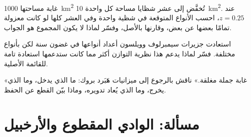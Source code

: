 \begin{exercise}[$\star\star\star$]\label{exo:b1:ecosystem-dynamics:10}
غابة مساحتها \qty{1000}{km^2} تُخفَّض إلى عشر شظايا مساحة كل واحدة
\qty{10}{km^2}. عند $z = 0.25$، احسب الأنواع المتوقعة في شظية
واحدة وفي العشر كلها لو كانت معزولة تمامًا بعضها عن بعض،
وقارنها بالأصل، وفسّر لماذا لا يكون المجموع هو الجواب.
\end{exercise}

\begin{exercise}[$\star\star\star$]\label{exo:b1:ecosystem-dynamics:11}
استعادت جزيرات سيمبرلوف وويلسون أعداد أنواعها في
غضون سنة لكن بأنواع مختلفة. فسّر لماذا يدعم هذا نظرية
التوازن أكثر مما كانت ستدعمها استعادة تامة للقائمة
الأصلية.
\end{exercise}

\begin{exercise}[$\star\star\star$]\label{exo:b1:ecosystem-dynamics:12}
«غابة  جملة مغلقة.» ناقش بالرجوع إلى
ميزانيات هَبَرد بروك: ما الذي يدخل، وما الذي يخرج، وما الذي يُعاد تدويره،
وماذا بيّن القطع عن  الحفظ.
\end{exercise}

\section{مسألة: الوادي المقطوع والأرخبيل}


